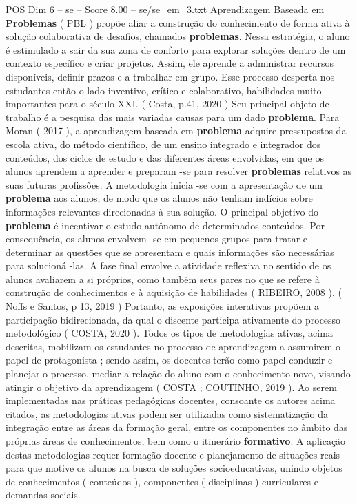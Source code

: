 \begin{textsample}{POS Dim 6 – se – Score 8.00 – se/se\_em\_3.txt}
Aprendizagem Baseada em \textbf{Problemas} ( PBL ) propõe aliar a construção do conhecimento de forma ativa à solução colaborativa de desafios, chamados \textbf{problemas}.
Nessa estratégia, o aluno é estimulado a sair da sua zona de conforto para explorar soluções dentro de um contexto específico e criar projetos.
Assim, ele aprende a administrar recursos disponíveis, definir prazos e a trabalhar em grupo.
Esse processo desperta nos estudantes então o lado inventivo, crítico e colaborativo, habilidades muito importantes para o século XXI. ( Costa, p.41, 2020 ) Seu principal objeto de trabalho é a pesquisa das mais variadas causas para um dado \textbf{problema}.
Para Moran ( 2017 ), a aprendizagem baseada em \textbf{problema} adquire pressupostos da escola ativa, do método científico, de um ensino integrado e integrador dos conteúdos, dos ciclos de estudo e das diferentes áreas envolvidas, em que os alunos aprendem a aprender e preparam -se para resolver \textbf{problemas} relativos as suas futuras profissões.
A metodologia inicia -se com a apresentação de um \textbf{problema} aos alunos, de modo que os alunos não tenham indícios sobre informações relevantes direcionadas à sua solução.
O principal objetivo do \textbf{problema} é incentivar o estudo autônomo de determinados conteúdos.
Por consequência, os alunos envolvem -se em pequenos grupos para tratar e determinar as questões que se apresentam e quais informações são necessárias para solucioná -las.
A fase final envolve a atividade reflexiva no sentido de os alunos avaliarem a si próprios, como também seus pares no que se refere à construção de conhecimentos e à aquisição de habilidades ( RIBEIRO, 2008 ). ( Noffs e Santos, p 13, 2019 ) Portanto, as exposições interativas propõem a participação bidirecionada, da qual o discente participa ativamente do processo metodológico ( COSTA, 2020 ).
Todos os tipos de metodologias ativas, acima descritas, mobilizam os estudantes no processo de aprendizagem a assumirem o papel de protagonista ; sendo assim, os docentes terão como papel conduzir e planejar o processo, mediar a relação do aluno com o conhecimento novo, visando atingir o objetivo da aprendizagem ( COSTA ; COUTINHO, 2019 ).
Ao serem implementadas nas práticas pedagógicas docentes, consoante os autores acima citados, as metodologias ativas podem ser utilizadas como sistematização da integração entre as áreas da formação geral, entre os componentes no âmbito das próprias áreas de conhecimentos, bem como o itinerário \textbf{formativo}.
A aplicação destas metodologias requer formação docente e planejamento de situações reais para que motive os alunos na busca de soluções socioeducativas, unindo objetos de conhecimentos ( conteúdos ), componentes ( disciplinas ) curriculares e demandas sociais.

\end{textsample}
